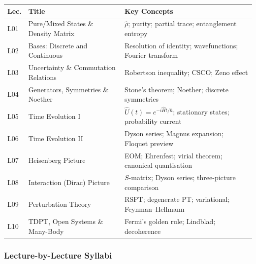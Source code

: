 \documentclass[11pt,a4paper]{article}
\begin{document}
{\footnotesize
\begin{center}
\begin{tabular}{@{}lp{4.2cm}p{6.8cm}@{}}
\toprule
\textbf{Lec.} & \textbf{Title} & \textbf{Key Concepts}\\
\midrule
L01 & Pure/Mixed States \& Density Matrix & $\hat\rho$; purity; partial trace; entanglement entropy\\
L02 & Bases: Discrete and Continuous & Resolution of identity; wavefunctions; Fourier transform\\
L03 & Uncertainty \& Commutation Relations & Robertson inequality; CSCO; Zeno effect\\
L04 & Generators, Symmetries \& Noether & Stone's theorem; Noether; discrete symmetries\\
L05 & Time Evolution I & $\hat{U}(t)=e^{-i\hat{H}t/\hbar}$; stationary states; probability current\\
\midrule
L06 & Time Evolution II & Dyson series; Magnus expansion; Floquet preview\\
L07 & Heisenberg Picture & EOM; Ehrenfest; virial theorem; canonical quantisation\\
L08 & Interaction (Dirac) Picture & $S$-matrix; Dyson series; three-picture comparison\\
L09 & Perturbation Theory & RSPT; degenerate PT; variational; Feynman--Hellmann\\
L10 & TDPT, Open Systems \& Many-Body & Fermi's golden rule; Lindblad; decoherence\\
\bottomrule
\end{tabular}
\end{center}
}

\subsubsection*{Lecture-by-Lecture Syllabi}
\end{document}
